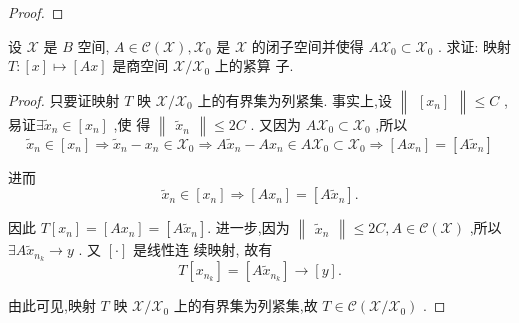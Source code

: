 \documentclass[lang=cn,newtx,10pt,scheme=chinese,thmcnt=chapter]{elegantbook}
\begin{document}
\begin{problemset}
\begin{proof}
\end{proof}
\item 设 \( \mathcal{X} \) 是 \( B \) 空间, \( A \in  \mathcal{C}\left( \mathcal{X}\right) ,{\mathcal{X}}_{0} \) 是 \( \mathcal{X} \) 的闭子空间并使得
\( A{\mathcal{X}}_{0} \subset  {\mathcal{X}}_{0} \) . 求证: 映射 \( T : \left\lbrack  x\right\rbrack   \mapsto  \left\lbrack  {Ax}\right\rbrack \) 是商空间 \( \mathcal{X}/{\mathcal{X}}_{0} \) 上的紧算
子.
\begin{proof}
    只要证映射 \( T \) 映 \( \mathcal{X}/{\mathcal{X}}_{0} \) 上的有界集为列紧集.
事实上,设 \( \begin{Vmatrix}\left\lbrack  {x}_{n}\right\rbrack  \end{Vmatrix} \leqslant  C \) ,易证\(\exists {\widetilde{x}}_{n} \in  \left\lbrack  {x}_{n}\right\rbrack \) ,使
得 \( \begin{Vmatrix}{\widetilde{x}}_{n}\end{Vmatrix} \leqslant  {2C} \) . 又因为 \( A{\mathcal{X}}_{0} \subset  {\mathcal{X}}_{0} \) ,所以
\[ {\widetilde{x}}_{n} \in  \left\lbrack  {x}_{n}\right\rbrack \Rightarrow {\widetilde{x}}_{n} - {x}_{n} \in  {\mathcal{X}}_{0} \Rightarrow  A{\widetilde{x}}_{n} - A{x}_{n} \in  A{\mathcal{X}}_{0} \subset  {\mathcal{X}}_{0} 
\Rightarrow  \left\lbrack  {A{x}_{n}}\right\rbrack   = \left\lbrack  {A{\widetilde{x}}_{n}}\right\rbrack \]

进而
\[ {\widetilde{x}}_{n} \in  \left\lbrack  {x}_{n}\right\rbrack   \Rightarrow  \left\lbrack  {A{x}_{n}}\right\rbrack   = \left\lbrack  {A{\widetilde{x}}_{n}}\right\rbrack  . \]

因此
\( T\left\lbrack  {x}_{n}\right\rbrack   = \left\lbrack  {A{x}_{n}}\right\rbrack   = \left\lbrack  {A{\widetilde{x}}_{n}}\right\rbrack  . \)
进一步,因为 \( \begin{Vmatrix}{\widetilde{x}}_{n}\end{Vmatrix} \leqslant  {2C},A \in  \mathcal{C}\left( \mathcal{X}\right) \) ,所以 \( \exists A{\widetilde{x}}_{{n}_{k}} \rightarrow  y \) . 又 \( \left\lbrack  \cdot \right\rbrack \) 是线性连
续映射, 故有
\[ T\left\lbrack  {x}_{{n}_{k}}\right\rbrack   = \left\lbrack  {A{\widetilde{x}}_{{n}_{k}}}\right\rbrack   \rightarrow  \left\lbrack  y\right\rbrack  . \]

由此可见,映射 \( T \) 映 \( \mathcal{X}/{\mathcal{X}}_{0} \) 上的有界集为列紧集,故
\( T \in  \mathcal{C}\left( {\mathcal{X}/{\mathcal{X}}_{0}}\right) \) .
\end{proof}



\end{problemset}
\end{document}
